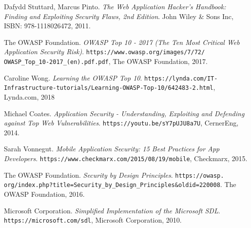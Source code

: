 \documentclass[a4paper]{article}
\begin{document}
\newpage

\begin{thebibliography}{9}


		Dafydd Stuttard, Marcus Pinto.
		\textit{The Web Application Hacker's Handbook: Finding and
		Exploiting Security Flaws, 2nd Edition}.
		John Wiley \& Sons Inc, ISBN: 978-1118026472, 2011.

		The OWASP Foundation.
		\textit{OWASP Top 10 - 2017 (The Ten Most Critical Web
		Application Security Risk)}.
		\texttt{https://www.owasp.org/images/7/72/
		OWASP\_Top\_10-2017\_(en).pdf.pdf}, The OWASP Foundation, 2017.

		Caroline Wong.
		\textit{Learning the OWASP Top 10}.
		\texttt{https://lynda.com/IT-\allowbreak{}
		Infrastructure-tutorials/Learning-OWASP-Top-10/642483-2.html},
		Lynda.com, 2018
		
		Michael Coates.
		\textit{Application Security - Understanding, Exploiting and
		Defending against Top Web Vulnerabilities}.
		\texttt{https://youtu.be/sY7pUJU8a7U}, CernerEng, 2014.

		Sarah Vonnegut.
		\textit{Mobile Application Security: 15 Best Practices for App
		Developers}.
		\texttt{https://www.checkmarx.com/2015/08/19/mobile},
		Checkmarx, 2015.

		The OWASP Foundation.
		\textit{Security by Design Principles}. 
		\texttt{https://owasp.\allowbreak{}
		org/index.php?title=Security\_by\_Design\_Principles\&oldid=220008}.
		The OWASP Foundation, 2016.

		Microsoft Corporation.
		\textit{Simplified Implementation of the Microsoft SDL}.
		\texttt{https://microsoft.com/sdl}, Microsoft Corporation, 2010.

\end{thebibliography}
\end{document}

